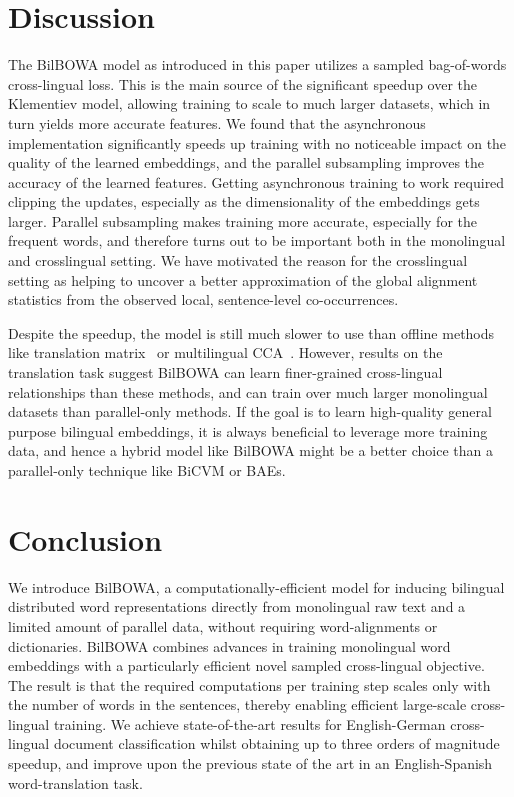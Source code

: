 \documentclass[10pt]{article}
\begin{document}
\section{Discussion}

The BilBOWA model as introduced in this paper utilizes a sampled 
bag-of-words cross-lingual loss. This is the main source of the significant
speedup over the Klementiev model, allowing training to scale to much larger
datasets, which in turn yields more accurate features.  We found that the
asynchronous implementation significantly speeds up training with no noticeable 
impact on the quality of the learned embeddings, and the parallel
subsampling improves the accuracy of the learned features.  Getting
asynchronous training to work required clipping the updates, especially as the
dimensionality of the embeddings gets larger. Parallel subsampling makes training 
more accurate, especially for the frequent
words, and therefore turns out to be important both in the monolingual and
crosslingual setting. We have motivated the reason for the crosslingual setting
as helping to uncover a better approximation of the global alignment statistics
from the observed local, sentence-level co-occurrences.

Despite the speedup, the model is still much slower to use than offline methods
like translation matrix~\cite{mikolov2013exploiting} or multilingual
CCA~\cite{faruqui2014improving}.  However, results on the translation task
suggest BilBOWA can learn finer-grained cross-lingual relationships than these
methods, and can train over much larger monolingual datasets than parallel-only
methods. If the goal is to learn high-quality general purpose bilingual
embeddings, it is always beneficial to leverage more training data, and
hence a hybrid model like BilBOWA might be a better choice than a parallel-only
technique like BiCVM or BAEs.

\section{Conclusion}
We introduce BilBOWA, a computationally-efficient model for inducing bilingual
distributed word representations directly from monolingual raw text and a limited
amount of parallel data, without requiring word-alignments or dictionaries.  
BilBOWA combines advances in training monolingual word embeddings with a
particularly efficient novel sampled cross-lingual objective.  The result is
that the required computations per training step scales only with the number of
words in the sentences, thereby enabling efficient large-scale cross-lingual
training.  We achieve state-of-the-art results for English-German cross-lingual
document classification whilst obtaining up to three orders of magnitude speedup, and 
improve upon the previous state of the art in an English-Spanish word-translation task.





\small


\end{document}
